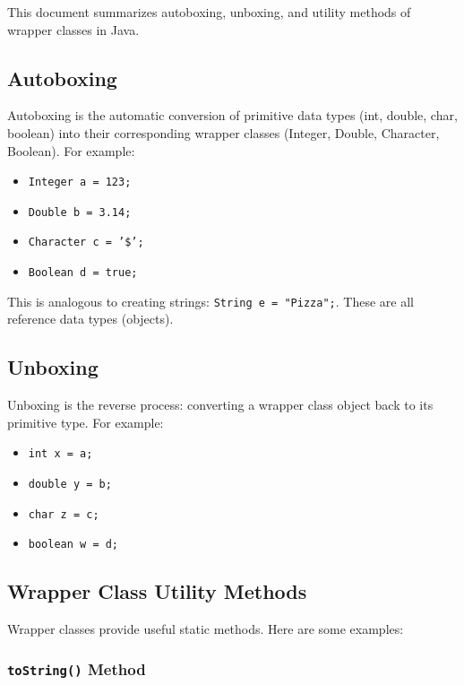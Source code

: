 \documentclass{article}
\begin{document}
This document summarizes autoboxing, unboxing, and utility methods of wrapper classes in Java.

\subsection{Autoboxing}

Autoboxing is the automatic conversion of primitive data types (int, double, char, boolean) into their corresponding wrapper classes (Integer, Double, Character, Boolean).  For example:

\begin{itemize}
    \item \texttt{Integer a = 123;}
    \item \texttt{Double b = 3.14;}
    \item \texttt{Character c = '\$';}
    \item \texttt{Boolean d = true;}
\end{itemize}

This is analogous to creating strings: \texttt{String e = "Pizza";}.  These are all reference data types (objects).

\subsection{Unboxing}

Unboxing is the reverse process: converting a wrapper class object back to its primitive type.  For example:

\begin{itemize}
    \item \texttt{int x = a;}
    \item \texttt{double y = b;}
    \item \texttt{char z = c;}
    \item \texttt{boolean w = d;}
\end{itemize}

\subsection{Wrapper Class Utility Methods}

Wrapper classes provide useful static methods.  Here are some examples:

\subsubsection{\texttt{toString()} Method}
\end{document}
